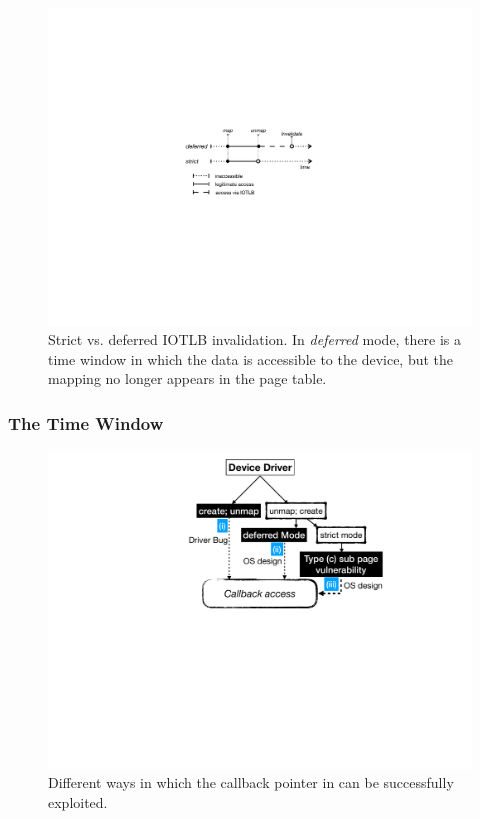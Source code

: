 \begin{figure}[t]
    \centering
    \includegraphics[width=0.75\columnwidth]{figs/strict.pdf}
    \caption{Strict vs. deferred IOTLB invalidation. In \emph{deferred} mode, there is a time window in which the data is accessible to the device, but the mapping no longer appears in the page table.}
    \label{fig:deferred}
\end{figure}

\subsubsection{The Time Window}\label{sec:shinfo}

\begin{figure}[t]
    \centering
    \includegraphics[width=0.75\linewidth]{figs/road_to_op.pdf}
    \caption{Different ways in which the callback pointer in \shinfo can be successfully exploited.}
    \label{fig:road_to_op}
\end{figure}


